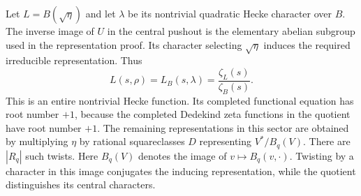 Let $L=B(\sqrt\eta)$ and let $\lambda$ be its nontrivial quadratic
Hecke character over $B$. The inverse image of $U$ in the central
pushout is the elementary abelian subgroup used in the representation
proof. Its character selecting $\sqrt\eta$ induces the required
irreducible representation. Thus
\begin{equation}\label{ar:quadratic-induction}
 L(s,\rho)=L_B(s,\lambda)=\frac{\zeta_L(s)}{\zeta_B(s)}.
\end{equation}
This is an entire nontrivial Hecke function. Its completed functional
equation has root number $+1$, because the completed Dedekind zeta
functions in the quotient have root number $+1$.
The remaining representations in this sector are obtained by multiplying
$\eta$ by rational squareclasses $D$ representing
$V^*/B_q(V)$. There are $|R_q|$ such twists. Here $B_q(V)$ denotes the
image of $v\mapsto B_q(v,\cdot)$. Twisting by a character in this image
conjugates the inducing representation, while the quotient distinguishes
its central characters.

